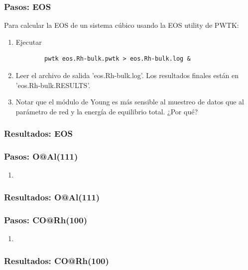 \subsubsection{Pasos: EOS}

  Para calcular la EOS de un sistema cúbico usando la EOS utility de PWTK:

  \begin{enumerate}
    \item Ejecutar
      \begin{verbatim}
        pwtk eos.Rh-bulk.pwtk > eos.Rh-bulk.log &
      \end{verbatim}
    \item Leer el archivo de salida 'eos.Rh-bulk.log'. Los resultados finales están en 'eos.Rh-bulk.RESULTS'.
    \item Notar que el módulo de Young es más sensible al muestreo de datos que al parámetro de red y la energía de equilibrio total. ¿Por qué?
  \end{enumerate}

\subsubsection{Resultados: EOS}
















\subsubsection{Pasos: O@Al(111)}

  \begin{enumerate}
    \item
      \begin{verbatim}

      \end{verbatim}
  \end{enumerate}

\subsubsection{Resultados: O@Al(111)}

\subsubsection{Pasos: CO@Rh(100)}

  \begin{enumerate}
    \item
      \begin{verbatim}

      \end{verbatim}
  \end{enumerate}

\subsubsection{Resultados: CO@Rh(100)}
